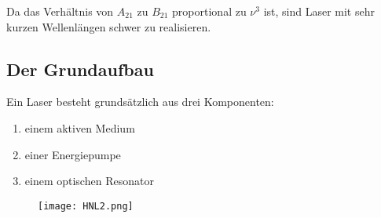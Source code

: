Da das Verhältnis von $A_{21}$ zu $B_21$ proportional zu $\nu^3$ ist, sind Laser mit sehr kurzen Wellenlängen schwer zu realisieren.

\subsection{Der Grundaufbau}

Ein Laser besteht grundsätzlich aus drei Komponenten:
\begin{enumerate}
\item einem aktiven Medium
\item einer Energiepumpe
\item einem optischen Resonator
\end{enumerate}

\begin{figure}[here]
\centering
\texttt{[image: HNL2.png]}
\begin{center}
\end{center}
\end{figure}

